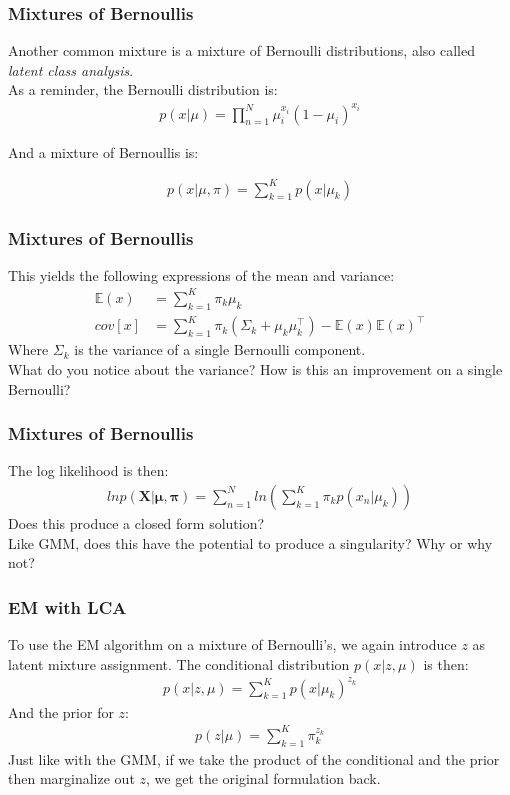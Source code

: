 \documentclass{beamer}
\begin{document}
\begin{frame}
\frametitle{Mixtures of Bernoullis}
	Another common mixture is a mixture of Bernoulli distributions, also called \textit{latent class analysis}.\\
	As a reminder, the Bernoulli distribution is:
	\begin{align*}
	p(x|\mu) = \prod_{n = 1}^{N} \mu_i^{x_i}(1 - \mu_i)^{x_i}
	\end{align*}
	
	And a mixture of Bernoullis is:
	
	\begin{align*}
		p(x|\mu, \pi) = \sum_{k=1}^{K}p(x|\mu_k) 
	\end{align*}
\end{frame}


\begin{frame}
\frametitle{Mixtures of Bernoullis}
	This yields the following expressions of the mean and variance:
	\begin{align*}
	\mathbb{E}(x)& = \sum_{k=1}^{K} \pi_k \mu_k \\
	cov[x]  &= \sum_{k=1}^{K}  \pi_k (\Sigma_k + \mu_k \mu_k^{\intercal}) - \mathbb{E}(x)\mathbb{E}(x)^{\intercal}
	\end{align*}
	Where $\Sigma_{k}$ is the variance of a single Bernoulli component.\\
	What do you notice about the variance? How is this an improvement on a single Bernoulli?
\end{frame}

\begin{frame}
\frametitle{Mixtures of Bernoullis}
	The log likelihood is then:
	\begin{align*}
	ln p(\mathbf{X}|\mathbf{\mu}, \mathbf{\pi}) = \sum_{n=1}^{N} ln (\sum_{k =1}^{K} \pi_k p(x_n|\mu_k))
	\end{align*}
	Does this produce a closed form solution?\\
	Like GMM, does this have the potential to produce a singularity? Why or why not?
\end{frame}

\begin{frame}
\frametitle{EM with LCA}
	To use the EM algorithm on a mixture of Bernoulli's, we again introduce $z$ as latent mixture assignment. The conditional distribution $p(x|z, \mu)$ is then:
	\begin{align*}
	p(x|z, \mu) = \sum_{k=1}^{K} p(x|\mu_k)^{z_k}
	\end{align*}
	And the prior for $z$:
	\begin{align*}
	p(z|\mu) = \sum_{k=1}^{K} \pi_k^{z_k}
	\end{align*}
	Just like with the GMM, if we take the product of the conditional and the prior then marginalize out $z$, we get the original formulation back.
\end{frame}
\end{document}
